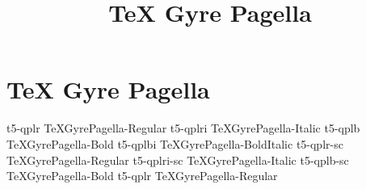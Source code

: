 \documentclass[sample]{vnsample}
\title{TeX Gyre Pagella}
\begin{document}
\section{TeX Gyre Pagella}
    {t5-qplr}     {TeXGyrePagella-Regular}
   {t5-qplri}    {TeXGyrePagella-Italic}
    {t5-qplb}     {TeXGyrePagella-Bold}
   {t5-qplbi}    {TeXGyrePagella-BoldItalic}
   {t5-qplr-sc}  {TeXGyrePagella-Regular}
 {t5-qplri-sc} {TeXGyrePagella-Italic}
   {t5-qplb-sc}  {TeXGyrePagella-Bold}
    {t5-qplr}     {TeXGyrePagella-Regular}
\end{document}
